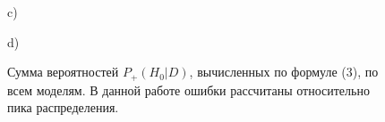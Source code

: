 \begin{figure}[H]
\begin{minipage}[h]{0.47\linewidth}
\end{minipage}
\vfill
\begin{minipage}[h]{0.47\linewidth}
 c) \\
\end{minipage}
\hfill
\begin{minipage}[h]{0.47\linewidth}
 d) \\
\end{minipage}
\caption{Сумма вероятностей $P_{+}( H_0 |D)$, вычисленных по формуле (3), по всем моделям. В данной работе ошибки рассчитаны относительно пика распределения.}
\label{fig:sumprobs}
\end{figure}




